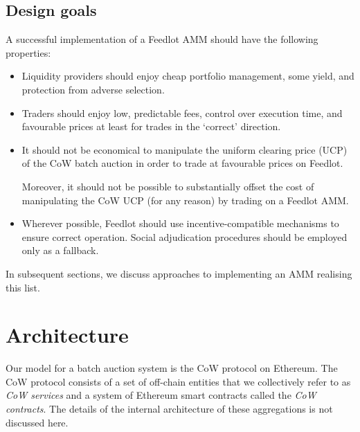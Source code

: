 \documentclass[a4paper,10pt]{article}
\theoremstyle{remark}
\begin{document}
\subsection{Design goals}

A successful implementation of a Feedlot AMM should have the following properties:
\begin{itemize}
  \item
    Liquidity providers should enjoy cheap portfolio management, some yield, and protection from adverse selection.
    
  \item
    Traders should enjoy low, predictable fees, control over execution time, and favourable prices at least for trades in the `correct' direction.
    
  \item
    It should not be economical to manipulate the uniform clearing price (UCP) of the CoW batch auction in order to trade at favourable prices on Feedlot.
    
    Moreover, it should not be possible to substantially offset the cost of manipulating the CoW UCP (for any reason) by trading on a Feedlot AMM.

  \item 
    Wherever possible, Feedlot should use incentive-compatible mechanisms to ensure correct operation.
    Social adjudication procedures should be employed only as a fallback.
  
\end{itemize}
%
In subsequent sections, we discuss approaches to implementing an AMM realising this list.


\section{Architecture}
\label{architecture}

Our model for a batch auction system is the CoW protocol on Ethereum.
%
The CoW protocol consists of a set of off-chain entities that we collectively refer to as \emph{CoW services} and a system of Ethereum smart contracts called the \emph{CoW contracts}. The details of the internal architecture of these aggregations is not discussed here.
\end{document}
